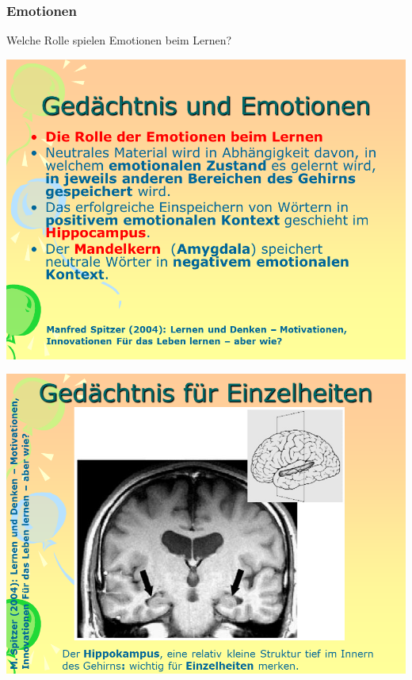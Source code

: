 \documentclass[
  letterpaper,
]{scrbook}
\begin{document}
\hypertarget{emotionen}{%
\subsubsection{Emotionen}\label{emotionen}}

Welche Rolle spielen Emotionen beim Lernen?

\includegraphics[width=1\textwidth,height=\textheight]{./pictures/neuro/Diapozitiv57.PNG}

\includegraphics[width=1\textwidth,height=\textheight]{./pictures/neuro/Diapozitiv58.PNG}
\end{document}
